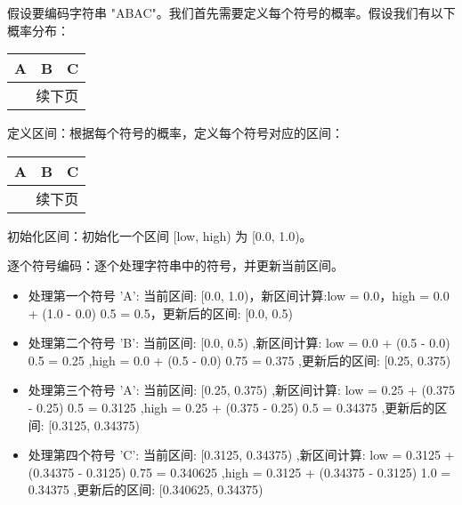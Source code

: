 \documentclass{/Users/hi/Study/template/code}
\begin{document}
\begin{tcolorbox}
	\small
	假设要编码字符串 "ABAC"。我们首先需要定义每个符号的概率。假设我们有以下概率分布：
	\begin{longtable}{ccc}
		\toprule
		\textbf{A} & \textbf{B} & \textbf{C} \\
		\midrule
		\endfirsthead
		\bottomrule()
		\multicolumn{3}{r}{续下页}
		\endfoot
		\bottomrule()
		\endlastfoot
		0.5        & 0.25       & 0.25
	\end{longtable}

	\begin{serialNumber}
		\item 定义区间：根据每个符号的概率，定义每个符号对应的区间：
		\begin{longtable}{ccc}
			\toprule
			\textbf{A} & \textbf{B}  & \textbf{C}  \\
			\midrule
			\endfirsthead
			\bottomrule()
			\multicolumn{3}{r}{续下页}
			\endfoot
			\bottomrule()
			\endlastfoot
			[0.0, 0.5) & [0.5, 0.75) & [0.75, 1.0) \\
		\end{longtable}

		\item 初始化区间：初始化一个区间 [low, high) 为 [0.0, 1.0)。
		\item 逐个符号编码：逐个处理字符串中的符号，并更新当前区间。
		\begin{equation}
			[low,high) \rightarrow  [low + (high - low)Symbol_{low} , low + ( high - low )Symbol_{high}]
		\end{equation}
		\begin{itemize}
			\item  处理第一个符号 'A': 当前区间: [0.0, 1.0)，新区间计算:low = 0.0，high = 0.0 + (1.0 - 0.0)  0.5 = 0.5，更新后的区间: [0.0, 0.5)
			\item  处理第二个符号 'B': 当前区间: [0.0, 0.5) ,新区间计算: low = 0.0 + (0.5 - 0.0)  0.5 = 0.25 ,high = 0.0 + (0.5 - 0.0)  0.75 = 0.375 ,更新后的区间: [0.25, 0.375)
			\item  处理第三个符号 'A': 当前区间: [0.25, 0.375) ,新区间计算: low = 0.25 + (0.375 - 0.25)  0.5 = 0.3125 ,high = 0.25 + (0.375 - 0.25)  0.5 = 0.34375 ,更新后的区间: [0.3125, 0.34375)
			\item  处理第四个符号 'C': 当前区间: [0.3125, 0.34375) ,新区间计算: low = 0.3125 + (0.34375 - 0.3125)  0.75 = 0.340625 ,high = 0.3125 + (0.34375 - 0.3125)  1.0 = 0.34375 ,更新后的区间: [0.340625, 0.34375)
		\end{itemize}


\end{serialNumber}
\end{tcolorbox}
\end{document}
